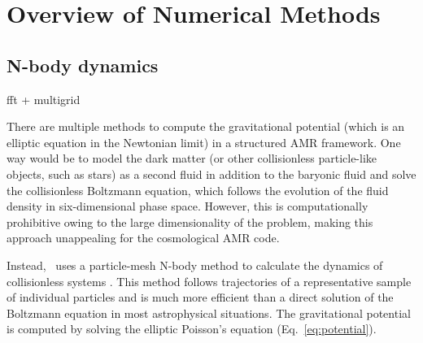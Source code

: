 \section{Overview of Numerical Methods}\label{sec.overview}

\subsection{N-body dynamics}\label{sec.ov.nbody}
fft + multigrid


There are multiple methods to compute the gravitational potential 
(which is an elliptic equation in the Newtonian limit) in a structured 
AMR framework.  One way would be to model the dark matter (or other
collisionless particle-like objects, such as stars) as a second fluid 
in addition to the baryonic fluid and solve the collisionless
Boltzmann equation, which follows the evolution of the fluid density in
six-dimensional phase space.  However, this is computationally prohibitive 
owing to the large dimensionality of the problem, making this approach 
unappealing for the cosmological AMR code.

Instead, \enzo\ uses a particle-mesh N-body method to calculate 
the dynamics of collisionless systems \citep{Hockney88}.  This method 
follows trajectories 
of a representative sample of individual particles and is much more 
efficient than a direct solution of the Boltzmann equation in most 
astrophysical situations. 
The gravitational potential is computed by solving the elliptic 
Poisson's equation (Eq.~\ref{eq:potential}).



